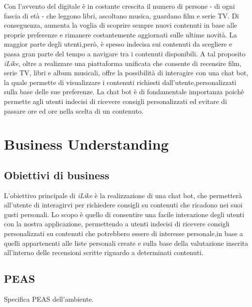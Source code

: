 \documentclass[a4paper, 12pt]{report}
\begin{document}
    Con l'avvento del digitale è in costante crescita il numero di persone - di ogni fascia di età - che leggono libri, ascoltano musica,
    guardano film e serie TV. Di conseguenza, aumenta la voglia di scoprire sempre nuovi contenuti in base alle proprie preferenze e rimanere
    costantemente aggiornati sulle ultime novità. La maggior parte degli utenti,però, è spesso indecisa sui contenuti da scegliere e passa gran parte
    del tempo a navigare tra i contenuti disponibili.
    A tal proposito \textit{iLike}, oltre a realizzare una piattaforma unificata che consente di recensire film, serie TV, libri e album musicali,
    offre la possibilità di interagire con una chat bot, la quale permette di visualizzare i contenuti richiesti dall’utente,personalizzati sulla base
    delle sue preferenze. La chat bot è di fondamentale importanza poichè permette agli utenti indecisi di ricevere consigli personalizzati ed evitare
    di passare ore ed ore nella scelta di un contenuto.



    \chapter{Business Understanding}\label{ch:business-understanding}


        \section{Obiettivi di business}\label{sec:obiettivi-di-business}

        L’obiettivo principale di \textit{iLike} è la realizzazione di una chat bot, che permetterà all’utente di interagirvi
        per richiedere consigli su contenuti che ricadono nei suoi gusti personali.
        Lo scopo è quello di consentire una facile interazione degli utenti con la nostra applicazione, permettendo a utenti indecisi di ricevere
        consigli personalizzati su contenuti che potrebbero essere di interesse personale,in base a quelli appartenenti alle liste personali create
        e sulla base della valutazione inserita all'interno delle recensioni scritte riguardo a determinati contenuti.

    \section{PEAS}\label{sec:peas}

            Specifica PEAS dell'ambiente.
\end{document}
